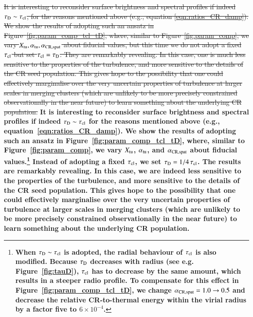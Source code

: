 \documentclass[fleqn,usenatbib,useAMS]{mnras}
\newcommand\C[1]{{\bf #1}}
\begin{document}
\sout{It is interesting to reconsider surface brightness and spectral profiles
  if indeed $\tau_{\rm D} \sim \tau_{\rm cl}$, for the reasons mentioned above
  (e.g., equation \ref{eqn:ratios_CR_damp}). We show the results of adopting
  such an ansatz in Figure~\ref{fig:param_comp_tcl_tD}, where, similar to
  Figure~\ref{fig:param_comp}, we vary $X_{\rm tu}, \alpha_{\rm tu}, \alpha_{\rm
    CR, spat}$ about fiducial values, but this time we do not adopt a fixed
  $\tau_{\rm cl}$ but set $\tau_{\rm cl}=\tau_{\rm D}$.  They are remarkably
  revealing. In this case, one is much less sensitive to the properties of the
  turbulence, and more sensitive to the details of the CR seed population. This
  gives hope to the possibility that one could effectively marginalise over the
  very uncertain properties of turbulence at larger scales in merging clusters
  (which are unlikely to be more precisely constrained observationally in the
  near future) to learn something about the underlying CR population.}  \C{It is
  interesting to reconsider surface brightness and spectral profiles if indeed
  $\tau_{\rm D} \sim \tau_{\rm cl}$ for the reasons mentioned above (e.g.,
  equation~\ref{eqn:ratios_CR_damp}). We show the results of adopting such an
  ansatz in Figure~\ref{fig:param_comp_tcl_tD}, where, similar to
  Figure~\ref{fig:param_comp}, we vary $X_{\rm tu}$, $\alpha_{\rm tu}$, and
  $\alpha_{\rm CR, spat}$ about fiducial values.\footnote{\C{When $\tau_{\rm D}
      \sim \tau_{\rm cl}$ is adopted, the radial behaviour of $\tau_{\rm cl}$ is
      also modified. Because $\tau_{\rm D}$ decreases with radius (see
      e.g. Figure~\ref{fig:tauD}), $\tau_{\rm cl}$ has to decrease by the same
      amount, which results in a steeper radio profile. To compensate for this
      effect in Figure~\ref{fig:param_comp_tcl_tD}, we change $\alpha_{\rm CR,
        spat}=1.0\rightarrow0.5$ and decrease the relative CR-to-thermal energy
      within the virial radius by a factor five to $6\times10^{-4}$.}} Instead
  of adopting a fixed $\tau_{\rm cl}$, we set $\tau_{\rm D} = 1/4 \,\tau_{\rm
    cl}$. The results are remarkably revealing. In this case, we are indeed less
  sensitive to the properties of the turbulence, and more sensitive to the
  details of the CR seed population.  This gives hope to the possibility that
  one could effectively marginalise over the very uncertain properties of
  turbulence at larger scales in merging clusters (which are unlikely to be more
  precisely constrained observationally in the near future) to learn something
  about the underlying CR population.}
\end{document}

